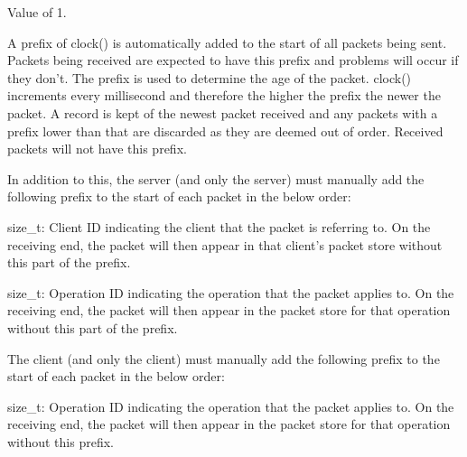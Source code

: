\begin{Desc}
\begin{description}
Value of 1. \item[{\em 
\hypertarget{class_net_mode_a43cfa55ee6a4db66a8d7d6c27f766964a947fd0828716fc0442ea546cce111c27}{
UDP\_\-PER\_\-CLIENT\_\-PER\_\-OPERATION}
\label{class_net_mode_a43cfa55ee6a4db66a8d7d6c27f766964a947fd0828716fc0442ea546cce111c27}
}]A prefix of clock() is automatically added to the start of all packets being sent. Packets being received are expected to have this prefix and problems will occur if they don't. The prefix is used to determine the age of the packet. clock() increments every millisecond and therefore the higher the prefix the newer the packet. A record is kept of the newest packet received and any packets with a prefix lower than that are discarded as they are deemed out of order. Received packets will not have this prefix. \par
\par


In addition to this, the server (and only the server) must manually add the following prefix to the start of each packet in the below order:
\begin{DoxyItemize}
\item size\_\-t: Client ID indicating the client that the packet is referring to. On the receiving end, the packet will then appear in that client's packet store without this part of the prefix.
\item size\_\-t: Operation ID indicating the operation that the packet applies to. On the receiving end, the packet will then appear in the packet store for that operation without this part of the prefix.\par
\par

\end{DoxyItemize}

The client (and only the client) must manually add the following prefix to the start of each packet in the below order:
\begin{DoxyItemize}
\item size\_\-t: Operation ID indicating the operation that the packet applies to. On the receiving end, the packet will then appear in the packet store for that operation without this prefix.\par
\par


\end{DoxyItemize}
\end{description}
\end{Desc}
